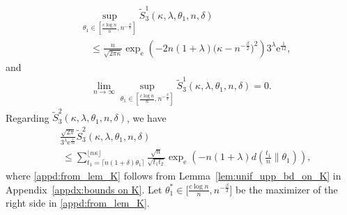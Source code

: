 \documentclass[journal, 10pt]{IEEEtran}
\newcommand{\rme}{\mathrm{e}}
\theoremstyle{plain}
\theoremstyle{plain}
\theoremstyle{plain}
\theoremstyle{plain}
\begin{document}
\begin{appendices}
\begin{IEEEproof}
\begin{align}
& \sup_{\theta_1 \in \left[ \frac{c\log n}{n} , n^{-\frac{\beta}{2}} \right] }\widetilde{S}_3^1(\kappa, \lambda, \theta_1, n, \delta) \nonumber \\
&\quad \le \frac{n}{\sqrt{2\pi\kappa}} \exp_\rme\left(-2n(1+\lambda) \big( \kappa - n^{-\frac{\beta}{2}} \big)^2\right)3^\lambda \rme^{\frac{1}{12}}\text{,} \label{appe:sup_last_ineq} 
\end{align}
and 
\begin{align}
	\lim_{n\to \infty} \sup_{\theta_1 \in \left[ \frac{c\log n}{n} , n^{-\frac{\beta}{2}} \right] }\widetilde{S}_3^1(\kappa, \lambda, \theta_1, n, \delta) = 0\text{.} \label{limit_of_stilde1}
\end{align}
Regarding $\widetilde{S}_3^2(\kappa, \lambda, \theta_1, n, \delta)$, we have
\begin{align}
&\frac{\sqrt{2\pi}}{3^\lambda \rme^{\frac{1}{12}}} \widetilde{S}_3^2(\kappa, \lambda, \theta_1, n, \delta) \nonumber \\ 
&\ \le \sum_{t_1=\lceil n(1+\delta)\theta_1 \rceil }^{\lfloor n\kappa \rfloor }
\frac{\sqrt{n} }{\sqrt{t_1t_2}} \exp_\rme\left(-n(1+\lambda) d\left(\tfrac{t_1}{n}\|\theta_1\right)\right)\text{,} \label{appd:from_lem_K} 
\end{align} 
where \eqref{appd:from_lem_K} follows from Lemma~\ref{lem:unif_upp_bd_on_K} in Appendix~\ref{appdx:bounds on K}. Let $\theta_1^\ast \in \big[ \frac{c\log n}{n} , n^{-\frac{\beta}{2}} \big]$ be the maximizer of the right side in \eqref{appd:from_lem_K}. 


\end{IEEEproof}
\end{appendices}
\end{document}
